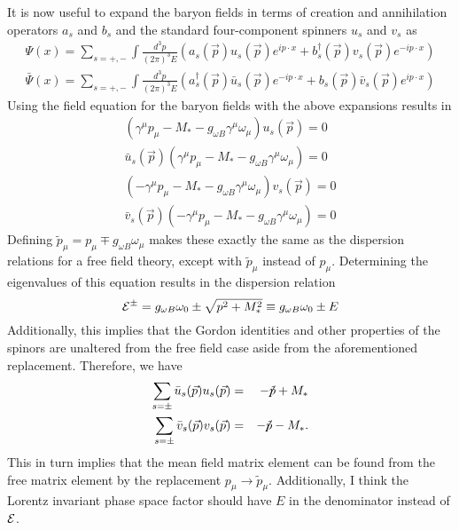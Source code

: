 \documentclass[12pt,letter]{article}
\newcommand{\script}[1]{\begin{cal} #1 \end{cal} }
\newcommand{\fsl}[1]{\ensuremath{\mathrlap{\!\not{\phantom{#1}}}#1}}
\begin{document}
It is now useful to expand the baryon fields in terms of creation and annihilation operators $a_s$ and $b_s$ and the standard four-component spinners $u_s$ and $v_s$ as 
\begin{eqnarray}
\Psi(x) = \sum_{s=+,-} \int \frac{d^3p}{(2 \pi)^3 E} \left(a_s(\vec{p}) u_s(\vec{p}) e^{ip\cdot x} + b^\dagger_s(\vec{p}) v_s(\vec{p}) e^{-ip\cdot x} \right ) \\ 
\bar \Psi(x) =  \sum_{s=+,-} \int \frac{d^3p}{(2 \pi)^3 E} \left(a_s^\dagger(\vec{p}) \bar u_s(\vec{p}) e^{-ip\cdot x} + b_s(\vec{p}) \bar v_s(\vec{p}) e^{ip\cdot x} \right )
\end{eqnarray}
Using the field equation for the baryon fields with the above expansions results in
\begin{eqnarray}
( \gamma^\mu p_\mu - M_*  - g_{\omega B} \gamma^\mu \omega_\mu)u_s(\vec{p}) = 0 \\
\bar u_s(\vec{p})  ( \gamma^\mu p_\mu - M_*  - g_{\omega B} \gamma^\mu \omega_\mu)= 0 \\
( -\gamma^\mu p_\mu - M_* - g_{\omega B} \gamma^\mu \omega_\mu)v_s(\vec{p}) = 0 \\
\bar v_s(\vec{p}) ( -\gamma^\mu p_\mu - M_* - g_{\omega B} \gamma^\mu \omega_\mu)= 0 
\end{eqnarray}
Defining $\tilde p_\mu = p_\mu \mp g_{\omega B} \omega_\mu$ makes these exactly the same as the dispersion relations for a free field theory, except with $\tilde p_\mu$ instead of $p_\mu$.  Determining the eigenvalues of this equation results in the dispersion relation
\begin{equation}
\script{E}^\pm = g_{\omega B} \omega_0 \pm \sqrt{p^2 + M^2_*} \equiv g_{\omega B} \omega_0 \pm E
\end{equation}
Additionally, this implies that the Gordon identities and other properties of the spinors are unaltered from the free field case aside from the aforementioned replacement.  Therefore, we have 
\begin{eqnarray}
\sum_{s=\pm} \bar u_s(\vec{p}) u_s(\vec{p}) &=& -\fsl{\tilde p} + M_* \\
\sum_{s=\pm} \bar v_s(\vec{p}) v_s(\vec{p}) &=& -\fsl{\tilde p} - M_*.
\end{eqnarray}
This in turn implies that the mean field matrix element can be found from the free matrix element by the replacement $p_\mu \rightarrow \tilde p_\mu$.  Additionally, I think the Lorentz invariant phase space factor should have $E$ in the denominator instead of $\script{E}$.
\end{document}
